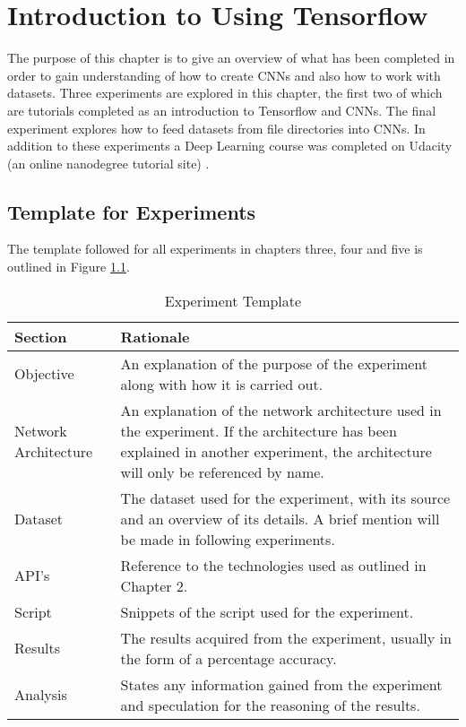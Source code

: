 \chapter{Introduction to Using Tensorflow}
The purpose of this chapter is to give an overview of what has been completed in order to gain understanding of how to create CNNs and also how to work with datasets.
Three experiments are explored in this chapter, the first two of which are tutorials completed as an introduction to Tensorflow and CNNs.
The final experiment explores how to feed datasets from file directories into CNNs.
In addition to these experiments a Deep Learning course was completed on Udacity (an online nanodegree tutorial site) \parencite{udacity}.

\section{Template for Experiments}
The template followed for all experiments in chapters three, four and five is outlined in Figure \ref{fig:expTemplate}.

\begin{table}[]
\centering
\caption{Experiment Template}
\label{fig:expTemplate}
\begin{tabular}{|p{4cm}|p{11cm}|}
\hline
\textbf{Section}   & \textbf{Rationale}                \\ \hline
Objective             & An explanation of the purpose of the experiment along with how it is carried out. \\ \hline
Network Architecture & An explanation of the network architecture used in the experiment. If the architecture has been explained in another experiment, the architecture will only be referenced by name.                       \\ \hline
Dataset              & The dataset used for the experiment, with its source and an overview of its details. A brief mention will be made in following experiments.                       \\ \hline
API's                & Reference to the technologies used as outlined in Chapter 2.                      \\ \hline
Script               & Snippets of the script used for the experiment.                       \\ \hline
Results              & The results acquired from the experiment, usually in the form of a percentage accuracy.                       \\ \hline
Analysis   & States any information gained from the experiment and speculation for the reasoning of the results.                      \\ \hline
\end{tabular}
\end{table}

